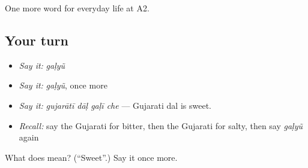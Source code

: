 \begin{grammarlens}[title={What you've built}]
One more word for everyday life at A2.
\end{grammarlens}

\subsection*{Your turn}
\begin{itemize}
\raggedright
  \item \emph{Say it:} \emph{gaḷyũ}
  \item \emph{Say it:} \emph{gaḷyũ}, once more
  \item \emph{Say it:} \emph{gujarātī dāḷ gaḷī che} — Gujarati dal is sweet.
  \item \emph{Recall:} say the Gujarati for bitter, then the Gujarati for salty, then say \emph{gaḷyũ} again
\end{itemize}

\begin{tcolorbox}[breakable,colback=teal!4,colframe=teal!35!black,title={Before you move on}]
What does  mean? (\textquotedblleft{}Sweet\textquotedblright{}.) Say it once more.
\end{tcolorbox}
